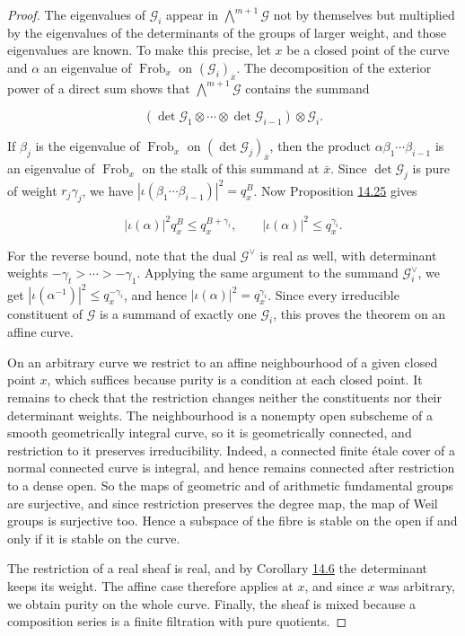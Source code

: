 \documentclass[11pt]{article}
\begin{document}
\begin{proof}[{Proof}]
The eigenvalues of \(\mathcal G_i\) appear in \(\bigwedge^{m+1}\mathcal G\) not by themselves but multiplied by the eigenvalues of the determinants of the groups of larger weight, and those eigenvalues are known. To make this precise, let \(x\) be a closed point of the curve and \(\alpha\) an eigenvalue of \(\operatorname{Frob}_x\) on \((\mathcal G_i)_{\bar x}\). The decomposition of the exterior power of a direct sum shows that \(\bigwedge^{m+1}\mathcal G\) contains the summand

\[
(\det\mathcal G_1\otimes\cdots\otimes\det\mathcal G_{i-1})
\otimes\mathcal G_i.
\]

If \(\beta_j\) is the eigenvalue of \(\operatorname{Frob}_x\) on \((\det\mathcal G_j)_{\bar x}\), then the product \(\alpha\beta_1\cdots\beta_{i-1}\) is an eigenvalue of \(\operatorname{Frob}_x\) on the stalk of this summand at \(\bar x\). Since \(\det\mathcal G_j\) is pure of weight \(r_j\gamma_j\), we have \(|\iota(\beta_1\cdots\beta_{i-1})|^2=q_x^B\). Now Proposition \hyperref[bp116]{14.25} gives

\[
|\iota(\alpha)|^2q_x^B\le q_x^{B+\gamma_i},
\qquad |\iota(\alpha)|^2\le q_x^{\gamma_i}.
\]

For the reverse bound, note that the dual \(\mathcal G^\vee\) is real as well, with determinant weights \(-\gamma_t>\cdots>-\gamma_1\). Applying the same argument to the summand \(\mathcal G_i^\vee\), we get \(|\iota(\alpha^{-1})|^2\le q_x^{-\gamma_i}\), and hence \(|\iota(\alpha)|^2=q_x^{\gamma_i}\). Since every irreducible constituent of \(\mathcal G\) is a summand of exactly one \(\mathcal G_i\), this proves the theorem on an affine curve.

On an arbitrary curve we restrict to an affine neighbourhood of a given closed point \(x\), which suffices because purity is a condition at each closed point. It remains to check that the restriction changes neither the constituents nor their determinant weights. The neighbourhood is a nonempty open subscheme of a smooth geometrically integral curve, so it is geometrically connected, and restriction to it preserves irreducibility. Indeed, a connected finite étale cover of a normal connected curve is integral, and hence remains connected after restriction to a dense open. So the maps of geometric and of arithmetic fundamental groups are surjective, and since restriction preserves the degree map, the map of Weil groups is surjective too. Hence a subspace of the fibre is stable on the open if and only if it is stable on the curve.

The restriction of a real sheaf is real, and by Corollary \hyperref[bp61]{14.6} the determinant keeps its weight. The affine case therefore applies at \(x\), and since \(x\) was arbitrary, we obtain purity on the whole curve. Finally, the sheaf is mixed because a composition series is a finite filtration with pure quotients.
\end{proof}
\end{document}
